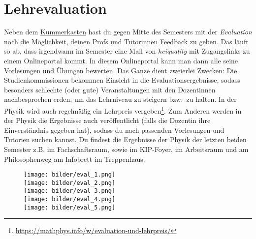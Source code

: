 \section{Lehrevaluation}
\label{eval}



\noindent Neben dem \hyperref[kummerkasten]{Kummerkasten} hast du gegen Mitte des Semesters mit der \emph{Evaluation} noch die Möglichkeit, deinen Profs und Tutorinnen Feedback zu geben. Das läuft so ab, dass irgendwann im Semester eine Mail von \textit{heiquality} mit Zugangslinks zu einem Onlineportal kommt. In diesem Onlineportal kann man dann alle seine Vorlesungen und Übungen bewerten.
Das Ganze dient zweierlei Zwecken: Die Studienkommissionen bekommen Einsicht in die Evaluationsergebnisse, sodass besonders schlechte (oder gute) Veranstaltungen mit den Dozentinnen nachbesprochen erden, um das Lehrniveau zu steigern bzw.\ zu halten. In der Physik wird auch regelmäßig ein Lehrpreis vergeben\footnote{\url{https://mathphys.info/w/evaluation-und-lehrpreis/}}. Zum Anderen werden in der Physik die Ergebnisse auch veröffentlicht (falls die Dozentin ihre Einverständnis gegeben hat), sodass du nach passenden Vorlesungen und Tutorien suchen kannst. Du findest die Ergebnisse der Physik der letzten beiden Semester z.B. im Fachschaftsraum, sowie im \gls{KIP}-Foyer, im Arbeitsraum und am Philosophenweg am Infobrett im Treppenhaus.


\begin{figure}[h]
    \begin{center}
        \texttt{[image: bilder/eval\_1.png]}\\
        \texttt{[image: bilder/eval\_2.png]}\\
        \texttt{[image: bilder/eval\_3.png]}\\
        \texttt{[image: bilder/eval\_4.png]}\\
        \texttt{[image: bilder/eval\_5.png]}\\
    \end{center}
\end{figure}

\vfill
